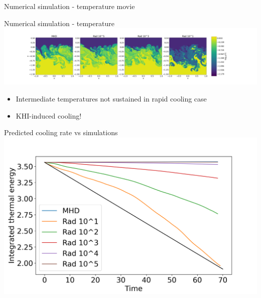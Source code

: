 \documentclass[10pt,aspectratio=169,usenames,dvipsnames]{beamer}
\begin{document}
\begin{frame}{Numerical simulation - temperature movie}
\end{frame}

\begin{frame}{Numerical simulation - temperature}
    \centering
   \includegraphics[width=0.99\linewidth,clip=true,trim=7.9cm 0.8cm 8.9cm 0.8cm]{2023Dundee/Figures/denstempevo_T_t0071.png}
\begin{itemize}
    \item Intermediate temperatures not sustained in rapid cooling case
    \item KHI-induced cooling!
\end{itemize}
\end{frame}

\begin{frame}{Predicted cooling rate vs simulations}
\centering
\includegraphics[width=0.85\linewidth,clip=true,trim=0.0cm 0.0cm 0.9cm 0.8cm]{2023Dundee/Figures/integrated_thermal_energy_2.png}
\end{frame}
\end{document}
